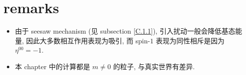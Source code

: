 \section{remarks}
\begin{itemize}
	\item 由于 seesaw mechanism (见 subsection \ref{C.1.1}), 引入扰动一般会降低基态能量, 因此大多数相互作用表现为吸引, 而 spin-$1$ 表现为同性相斥是因为 $\eta^{0 0} = - 1$.
	
	\item 本 chapter 中的计算都是 $m \neq 0$ 的粒子, 与真实世界有差异.
\end{itemize}
